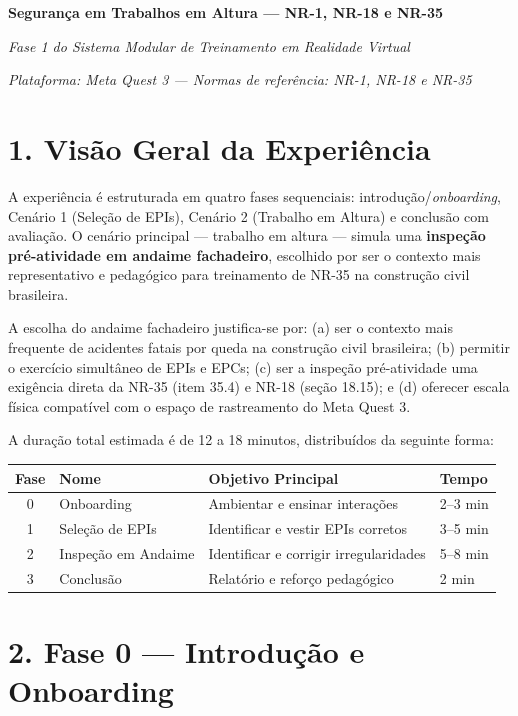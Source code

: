 \label{an:roteiro}

\textbf{Segurança em Trabalhos em Altura --- NR-1, NR-18 e NR-35}

\textit{Fase 1 do Sistema Modular de Treinamento em Realidade Virtual}

\textit{Plataforma: Meta Quest 3 --- Normas de referência: NR-1, NR-18 e NR-35}

\section*{1. Visão Geral da Experiência}

A experiência é estruturada em quatro fases sequenciais: introdução/\textit{onboarding}, Cenário 1 (Seleção de EPIs), Cenário 2 (Trabalho em Altura) e conclusão com avaliação. O cenário principal --- trabalho em altura --- simula uma \textbf{inspeção pré-atividade em andaime fachadeiro}, escolhido por ser o contexto mais representativo e pedagógico para treinamento de NR-35 na construção civil brasileira.

A escolha do andaime fachadeiro justifica-se por: (a) ser o contexto mais frequente de acidentes fatais por queda na construção civil brasileira; (b) permitir o exercício simultâneo de EPIs e EPCs; (c) ser a inspeção pré-atividade uma exigência direta da NR-35 (item 35.4) e NR-18 (seção 18.15); e (d) oferecer escala física compatível com o espaço de rastreamento do Meta Quest 3.

A duração total estimada é de 12 a 18 minutos, distribuídos da seguinte forma:

\begin{table}[h]
\centering
\begin{tabular}{clll}
\hline
\textbf{Fase} & \textbf{Nome} & \textbf{Objetivo Principal} & \textbf{Tempo} \\
\hline
0 & Onboarding & Ambientar e ensinar interações & 2--3 min \\
1 & Seleção de EPIs & Identificar e vestir EPIs corretos & 3--5 min \\
2 & Inspeção em Andaime & Identificar e corrigir irregularidades & 5--8 min \\
3 & Conclusão & Relatório e reforço pedagógico & 2 min \\
\hline
\end{tabular}
\end{table}

\section*{2. Fase 0 --- Introdução e Onboarding}


